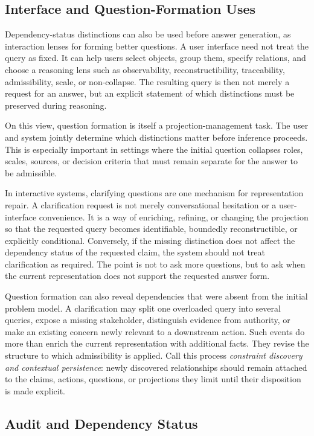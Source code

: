 \documentclass[11pt]{article}
\theoremstyle{definition}
\theoremstyle{remark}
\begin{document}
\subsection{Interface and Question-Formation Uses}

Dependency-status distinctions can also be used before answer generation, as interaction lenses for forming better questions. A user interface need not treat the query as fixed. It can help users select objects, group them, specify relations, and choose a reasoning lens such as observability, reconstructibility, traceability, admissibility, scale, or non-collapse. The resulting query is then not merely a request for an answer, but an explicit statement of which distinctions must be preserved during reasoning.

On this view, question formation is itself a projection-management task. The user and system jointly determine which distinctions matter before inference proceeds. This is especially important in settings where the initial question collapses roles, scales, sources, or decision criteria that must remain separate for the answer to be admissible.

In interactive systems, clarifying questions are one mechanism for representation repair. A clarification request is not merely conversational hesitation or a user-interface convenience. It is a way of enriching, refining, or changing the projection so that the requested query becomes identifiable, boundedly reconstructible, or explicitly conditional. Conversely, if the missing distinction does not affect the dependency status of the requested claim, the system should not treat clarification as required. The point is not to ask more questions, but to ask when the current representation does not support the requested answer form.

Question formation can also reveal dependencies that were absent from the initial problem model. A clarification may split one overloaded query into several queries, expose a missing stakeholder, distinguish evidence from authority, or make an existing concern newly relevant to a downstream action. Such events do more than enrich the current representation with additional facts. They revise the structure to which admissibility is applied. Call this process \emph{constraint discovery and contextual persistence}: newly discovered relationships should remain attached to the claims, actions, questions, or projections they limit until their disposition is made explicit.

\subsection{Audit and Dependency Status}
\end{document}
